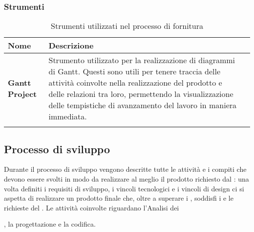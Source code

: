 \subsubsection{Strumenti}

\setlength{\freewidth}{\dimexpr\textwidth-0\tabcolsep}
	\renewcommand{\arraystretch}{1.5}
	\setlength{\aboverulesep}{0pt}
	\setlength{\belowrulesep}{0pt}
	\begin{longtable}{L{.210\freewidth} L{.6\freewidth} L{.080\freewidth}}
		\toprule 
		\textbf{Nome} & \textbf{Descrizione} \\
		\toprule
		\endhead		
		\textbf{Gantt Project} & Strumento utilizzato per la realizzazione di  diagrammi di Gantt. Questi sono utili per tenere traccia delle attività coinvolte nella realizzazione del prodotto e delle relazioni tra loro, permettendo la visualizzazione delle tempistiche di avanzamento del lavoro in maniera immediata. \\
		\bottomrule
		\hiderowcolors
		\caption{Strumenti utilizzati nel processo di fornitura}
	\end{longtable}


\subsection{Processo di sviluppo}
Durante il processo di sviluppo vengono descritte tutte le attività e i compiti che devono essere svolti in modo da realizzare al meglio il prodotto richiesto dal : una volta definiti i requisiti di sviluppo, i vincoli tecnologici e i vincoli di design ci si aspetta di realizzare un prodotto finale che, oltre a superare i , soddisfi i  e le richieste del . Le attività coinvolte riguardano l'Analisi dei , la progettazione e la codifica.
